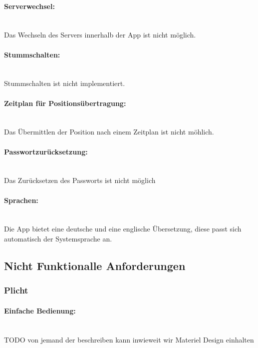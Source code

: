 \documentclass[parskip=full,11pt]{scrartcl}
\begin{document}
\paragraph{\small Serverwechsel:} \hspace{0pt} \\
Das Wechseln des Servers innerhalb der App ist nicht möglich.

\paragraph{\small Stummschalten:} \hspace{0pt} \\
Stummschalten ist nicht implementiert.

\paragraph{\small Zeitplan für Positionsübertragung:} \hspace{0pt} \\
Das Übermittlen der Position nach einem Zeitplan ist nicht möhlich.

\paragraph{\small Passwortzurücksetzung:} \hspace{0pt} \\
Das Zurücksetzen des Passworts ist nicht möglich

\paragraph{\small Sprachen:} \hspace{0pt} \\
Die App bietet eine deutsche und eine englische Übersetzung, diese passt sich
automatisch der Systemsprache an.

\subsection{Nicht Funktionalle Anforderungen}
\subsubsection{Plicht}
\paragraph{\small Einfache Bedienung:} \hspace{0pt} \\
TODO von jemand der beschreiben kann inwieweit wir Materiel Design einhalten
\end{document}
